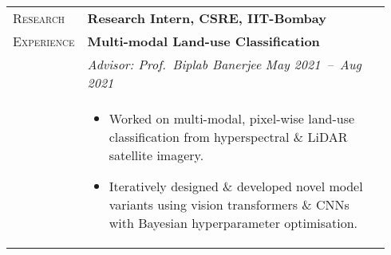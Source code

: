 \documentclass[letterpaper, 10pt, oneside]{article}
\newcommand{\stitle}[1]{\normalsize{\textsc{#1}}}
\newcommand{\bdit}[1]{{\textbf{#1}}}
\begin{document}
\begin{longtable}{@{} p{0.14\linewidth} p{0.8\linewidth}}


    \stitle{Research}    & \bdit{Research Intern, CSRE, IIT-Bombay}                                                                                                                                                                                 \\
    \stitle{Experience}  & \bdit{Multi-modal Land-use Classification}                                                                                                                                                                               \\
                         & \textsl{Advisor: Prof.\ Biplab Banerjee} \hfill \hspace{-3em} \textsl{May 2021\ --\ Aug 2021}                                                                                                                            \\
                         & \parbox{0.8\textwidth}{                                                                                                                                                                                                  %
        \begin{itemize}[leftmargin=*, itemsep=-0.88ex, topsep=-0.88ex]
            \item Worked on multi-modal, pixel-wise land-use classification from hyperspectral \& LiDAR satellite imagery.
            \item Iteratively designed \& developed novel model variants using vision transformers \& CNNs with Bayesian hyperparameter optimisation.
        \end{itemize}
    }
    \\
    \\


\end{longtable}
\end{document}
